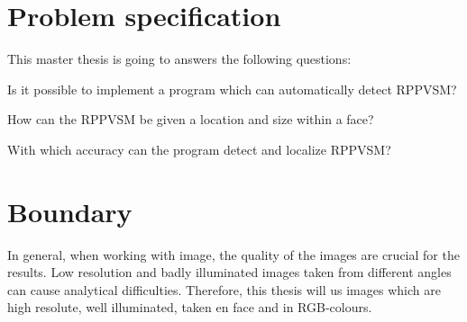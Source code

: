 \section{Problem specification}
This master thesis is going to answers the following questions: 
\begin{displayquote}
	Is it possible to implement a program which can automatically detect RPPVSM?

	How can the RPPVSM be given a location and size within a face?

	With which accuracy can the program detect and localize RPPVSM?
\end{displayquote}



\section{Boundary}

In general, when working with image, the quality of the images are crucial for the results. Low resolution and badly illuminated images taken from different angles can cause analytical difficulties. Therefore, this thesis will us images which are high resolute, well illuminated, taken en face and in RGB-colours. 
